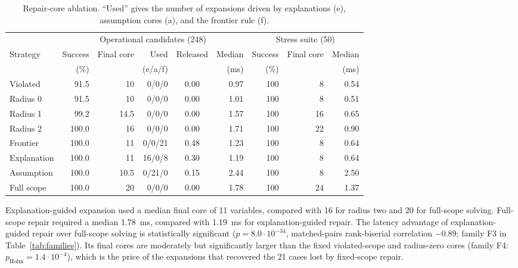 \documentclass[pdflatex,sn-mathphys-num,iicol,oneside]{sn-jnl}
\begin{document}
\begin{table}[t]
\centering
\caption{
Repair-core ablation. ``Used'' gives the number of expansions driven
by explanations (e), assumption cores (a), and the frontier rule (f).
}
\label{tab:repair-results}
\setlength{\tabcolsep}{5pt}
\small

\begin{tabular}{lrrrcr@{\hspace{7pt}}rrr}
\toprule
&
\multicolumn{5}{c}{Operational candidates (248)}
&
\multicolumn{3}{c}{Stress suite (50)}
\\
\cmidrule(r){2-6}
\cmidrule(l){7-9}

Strategy &
Success &
Final core &
Used &
Released &
Median &
Success &
Final core &
Median\\
&
(\%) &
&
(e/a/f) &
&
(ms) &
(\%) &
&
(ms)\\
\midrule

Violated
& 91.5 & 10 & 0/0/0 & 0.00 & 0.97
& 100 & 8 & 0.54\\

Radius 0
& 91.5 & 10 & 0/0/0 & 0.00 & 1.01
& 100 & 8 & 0.51\\

Radius 1
& 99.2 & 14.5 & 0/0/0 & 0.00 & 1.57
& 100 & 16 & 0.65\\

Radius 2
& 100.0 & 16 & 0/0/0 & 0.00 & 1.71
& 100 & 22 & 0.90\\

Frontier
& 100.0 & 11 & 0/0/21 & 0.48 & 1.23
& 100 & 8 & 0.64\\

Explanation
& 100.0 & 11 & 16/0/8 & 0.30 & 1.19
& 100 & 8 & 0.64\\

Assumption
& 100.0 & 10.5 & 0/21/0 & 0.15 & 2.44
& 100 & 8 & 2.50\\

Full scope
& 100.0 & 20 & 0/0/0 & 0.00 & 1.78
& 100 & 24 & 1.37\\

\bottomrule
\end{tabular}
\normalsize
\end{table}

Explanation-guided expansion used a median final core of 11 variables,
compared with 16 for radius two and 20 for full-scope solving.
Full-scope repair required a median 1.78~ms, compared with 1.19~ms for
explanation-guided repair. The latency advantage of explanation-guided repair over full-scope solving is statistically significant ($p=8.0\cdot 10^{-34}$, matched-pairs rank-biserial correlation $-0.89$; family F3 in Table~\ref{tab:families}). Its final cores are moderately but significantly larger than the fixed violated-scope and radius-zero cores (family F4: $p_{\mathrm{Holm}}=1.4\cdot 10^{-4}$), which is the price of the expansions that recovered the 21 cases lost by fixed-scope repair.
\end{document}
